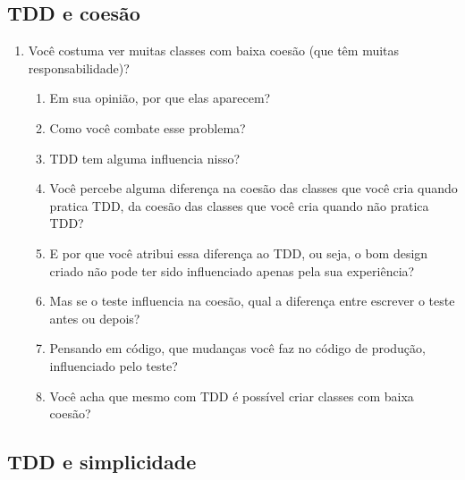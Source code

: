 \subsection{TDD e coesão}
\label{entrevista:coesao}

\begin{enumerate}
	\item{Você costuma ver muitas classes com baixa coesão (que têm muitas responsabilidade)?}
		\begin{enumerate}
			\item Em sua opinião, por que elas aparecem?

			\item Como você combate esse problema?

			\item TDD tem alguma influencia nisso?
			
			\item Você percebe alguma diferença na coesão das classes que você cria quando
			pratica TDD, da coesão das classes que você cria quando não pratica TDD?
			
			\item E por que você atribui essa diferença ao TDD, ou seja, o bom design
			criado não pode ter sido influenciado apenas pela sua experiência?
			
			\item Mas se o teste influencia na coesão, 
			qual a diferença entre escrever o teste antes ou depois?
			
			\item Pensando em código, que mudanças você faz no código de produção, influenciado
			pelo teste?

			\item Você acha que mesmo com TDD é possível criar classes com baixa coesão? 

		\end{enumerate}
\end{enumerate}

\subsection{TDD e simplicidade}
\label{entrevista:simplicidade}

